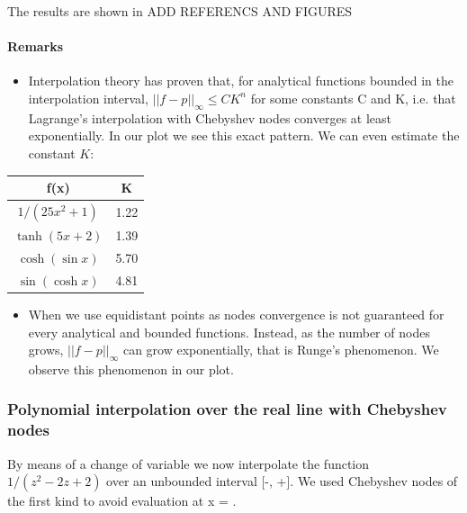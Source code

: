 \documentclass[a4paper,11]{article}
\begin{document}
The results are shown in ADD REFERENCS AND FIGURES

\paragraph{Remarks}
	
\begin{itemize}
	\item{
		Interpolation theory has proven that, for analytical functions
		bounded in the interpolation interval,
		$||f-p||_{\infty} \leq CK^{n}$ for
		some constants C and K, i.e. that Lagrange's interpolation with 
		Chebyshev nodes converges at least exponentially. In our plot we
		see this exact pattern. We can even estimate the constant $K$:
	}
\end{itemize}

\begin{table}[ht]
	\centering
	\begin{tabular}{c|c}
		f(x) & K \\
		\hline
		$1/(25x^2 + 1)$ & 1.22 \\
		$\tanh(5x+2)$ & 1.39 \\
		$\cosh(\sin x)$ & 5.70 \\
		$\sin(\cosh x)$ & 4.81 \\
	\end{tabular}
\end{table}


\begin{itemize}
	\item{
		When we use equidistant points as nodes convergence is not
		guaranteed for every analytical and bounded functions. Instead, as the 
		number of nodes grows, $||f-p||_{\infty}$ can grow exponentially,
		that is Runge's phenomenon. We observe this phenomenon in our plot.
	}
\end{itemize}

\subsubsection{Polynomial interpolation over the real line with Chebyshev nodes}

By means of a change of variable we now interpolate the function $1/(z^2-2z+2)$
over an unbounded interval [-\infty, +\infty]. We used 
Chebyshev nodes of the first kind to avoid evaluation at x = \pm \infty.
\end{document}
